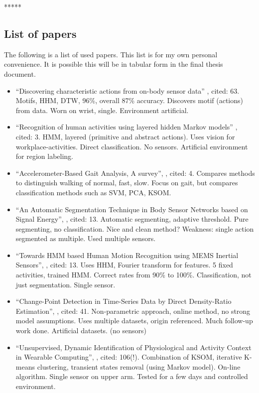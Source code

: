 
*****
\subsection{List of papers}
The following is a list of used papers.
This list is for my own personal convenience.
It is possible this will be in tabular form in the final thesis document.
\begin{itemize}
  \item ``Discovering characteristic actions from on-body sensor data'' \cite{minnen2006discovering}, cited: 63. Motifs, HHM, DTW, 96\%, overall 87\% accuracy. Discovers motif (actions) from data. Worn on wrist, single. Environment artificial.
  \item ``Recognition of human activities using layered hidden Markov models'' \cite{perdikis2008recognition}, cited: 3. HMM, layered (primitive and abstract actions). Uses vision for workplace-activities. Direct classification. No sensors. Artificial environment for region labeling.
  \item ``Accelerometer-Based Gait Analysis, A survey'', \cite{derawi2010accelerometer}, cited: 4. Compares methods to distinguish walking of normal, fast, slow. Focus on gait, but compares classification methods such as SVM, PCA, KSOM.
  \item ``An Automatic Segmentation Technique in Body Sensor Networks based on Signal Energy'', \cite{guenterberg2009automatic}, cited: 13. Automatic segmenting, adaptive threshold. Pure segmenting, no classification. Nice and clean method? Weakness: single action segmented as multiple. Used multiple sensors.
  \item ``Towards HMM based Human Motion Recognition using MEMS Inertial Sensors'', \cite{shi2009towards}, cited: 13. Uses HHM, Fourier transform for features. 5 fixed activities, trained HMM. Correct rates from 90\% to 100\%. Classification, not just segmentation. Single sensor.
  \item ``Change-Point Detection in Time-Series Data by Direct Density-Ratio Estimation'', \cite{kawahara2009change}, cited: 41. Non-parametric approach, online method, no strong model assumptions. Uses multiple datasets, origin referenced. Much follow-up work done. Artificial datasets. (no sensors)
  \item ``Unsupervised, Dynamic Identification of Physiological and Activity Context in Wearable Computing'', \cite{krause2003unsupervised}, cited: 106(!). Combination of KSOM, iterative K-means clustering, transient states removal (using Markov model). On-line algorithm. Single sensor on upper arm. Tested for a few days and controlled environment.

\end{itemize}
